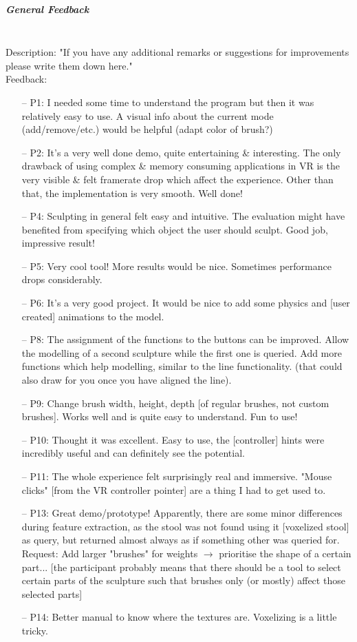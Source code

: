 \subparagraph{General Feedback} \hfill \\
Description: "If you have any additional remarks or suggestions for improvements please write them down here."\\
Feedback:
\begin{enumerate} \setlength\itemsep{-0.5em}
	\item[--] P1: I needed some time to understand the program but then it was relatively easy to use. A visual info about the current mode (add/remove/etc.) would be helpful (adapt color of brush?)
	\item[--] P2: It's a very well done demo, quite entertaining \& interesting. The only drawback of using complex \& memory consuming applications in VR is the very visible \& felt framerate drop which affect the experience. Other than that, the implementation is very smooth. Well done!
	\item[--] P4: Sculpting in general felt easy and intuitive. The evaluation might have benefited from specifying which object the user should sculpt. Good job, impressive result!
	\item[--] P5: Very cool tool! More results would be nice. Sometimes performance drops considerably.
	\item[--] P6: It's a very good project. It would be nice to add some physics and [user created] animations to the model.
	\item[--] P8: The assignment of the functions to the buttons can be improved. Allow the modelling of a second sculpture while the first one is queried. Add more functions which help modelling, similar to the line functionality. (that could also draw for you once you have aligned the line).
	\item[--] P9: Change brush width, height, depth [of regular brushes, not custom brushes]. Works well and is quite easy to understand. Fun to use!
	\item[--] P10: Thought it was excellent. Easy to use, the [controller] hints were incredibly useful and can definitely see the potential.
	\item[--] P11: The whole experience felt surprisingly real and immersive. "Mouse clicks" [from the VR controller pointer] are a thing I had to get used to.
	\item[--] P13: Great demo/prototype! Apparently, there are some minor differences during feature extraction, as the stool was not found using it [voxelized stool] as query, but returned almost always as if something other was queried for. Request: Add larger "brushes" for weights $\rightarrow$ prioritise the shape of a certain part... [the participant probably means that there should be a tool to select certain parts of the sculpture such that brushes only (or mostly) affect those selected parts]
	\item[--] P14: Better manual to know where the textures are. Voxelizing is a little tricky.
\end{enumerate}

